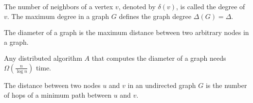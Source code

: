 \documentclass[11pt, oneside]{book}   						%
\begin{document}
\begin{mydef}[Degree] The number of neighbors of a vertex $v$, denoted by $\delta(v)$, is called the degree of $v$. The maximum degree in a graph $G$ defines the graph degree $\Delta(G)=\Delta$.\end{mydef}
\begin{mydef}[Diameter] The diameter of a graph is the maximum distance between two arbitrary nodes in a graph.\end{mydef}
\begin{mythm} Any distributed algorithm $A$ that computes the diameter of a graph needs $\Omega\left(\frac{n}{\log n}\right)$ time.\end{mythm}
\begin{mydef}[Distance] The distance between two nodes $u$ and $v$ in an undirected graph $G$ is the number of hops of a minimum path between $u$ and $v$.\end{mydef}
\end{document}

